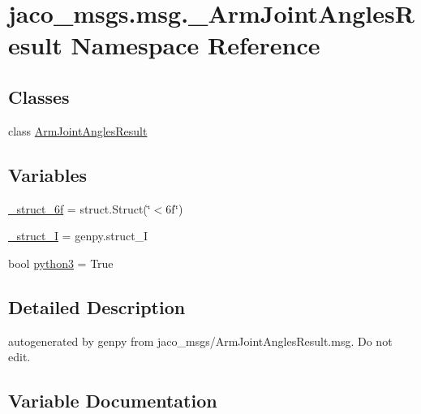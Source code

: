 \hypertarget{namespacejaco__msgs_1_1msg_1_1__ArmJointAnglesResult}{}\section{jaco\+\_\+msgs.\+msg.\+\_\+\+Arm\+Joint\+Angles\+Result Namespace Reference}
\label{namespacejaco__msgs_1_1msg_1_1__ArmJointAnglesResult}
\subsection*{Classes}
\begin{DoxyCompactItemize}
\item 
class \hyperlink{classjaco__msgs_1_1msg_1_1__ArmJointAnglesResult_1_1ArmJointAnglesResult}{Arm\+Joint\+Angles\+Result}
\end{DoxyCompactItemize}
\subsection*{Variables}
\begin{DoxyCompactItemize}
\item 
\hyperlink{namespacejaco__msgs_1_1msg_1_1__ArmJointAnglesResult_a5cd4c953e3cb72d48f6f3a42b1eb862d}{\+\_\+struct\+\_\+6f} = struct.\+Struct(\char`\"{}$<$6f\char`\"{})
\item 
\hyperlink{namespacejaco__msgs_1_1msg_1_1__ArmJointAnglesResult_a6dbd5beb52fed045449ec9522575594e}{\+\_\+struct\+\_\+I} = genpy.\+struct\+\_\+I
\item 
bool \hyperlink{namespacejaco__msgs_1_1msg_1_1__ArmJointAnglesResult_a99a6b58960b411a6cbd6f8d01cbc59c9}{python3} = True
\end{DoxyCompactItemize}


\subsection{Detailed Description}
\begin{DoxyVerb}autogenerated by genpy from jaco_msgs/ArmJointAnglesResult.msg. Do not edit.\end{DoxyVerb}
 

\subsection{Variable Documentation}
